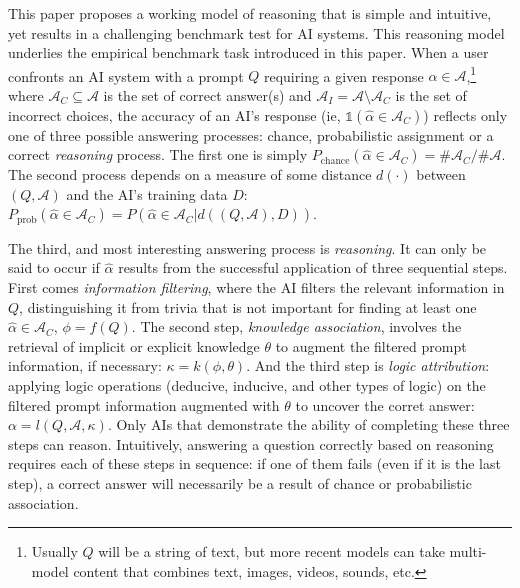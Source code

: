 \documentclass[
]{article}
\begin{document}
This paper proposes a working model of reasoning that is simple and
intuitive, yet results in a challenging benchmark test for AI systems.
This reasoning model underlies the empirical benchmark task introduced
in this paper. When a user confronts an AI system with a prompt \(Q\)
requiring a given response \(\alpha \in \mathcal{A}\),\footnote{Usually
  \(Q\) will be a string of text, but more recent models can take
  multi-model content that combines text, images, videos, sounds, etc.}
where \(\mathcal{A}_C \subseteq \mathcal{A}\) is the set of correct
answer(s) and \(\mathcal{A}_I = \mathcal{A} \setminus \mathcal{A}_C\) is
the set of incorrect choices, the accuracy of an AI's response (ie,
\(\mathbb{1}(\hat{\alpha} \in \mathcal{A}_C)\)) reflects only one of
three possible answering processes: chance, probabilistic assignment or
a correct \emph{reasoning} process. The first one is simply
\(P_{\text{chance}}(\hat{\alpha} \in \mathcal{A}_C) = \#\mathcal{A}_C / \#\mathcal{A}\).
The second process depends on a measure of some distance \(d(\cdot)\)
between \((Q, \mathcal{A})\) and the AI's training data \(D\):
\(P_{\text{prob}}(\hat{\alpha} \in \mathcal{A}_C) = P(\hat{\alpha} \in \mathcal{A}_C|d((Q, \mathcal{A}), D))\).

The third, and most interesting answering process is \emph{reasoning}.
It can only be said to occur if \(\hat{\alpha}\) results from the
successful application of three sequential steps. First comes
\emph{information filtering}, where the AI filters the relevant
information in \(Q\), distinguishing it from trivia that is not
important for finding at least one \(\hat{\alpha} \in \mathcal{A}_C\),
\(\phi = f(Q)\). The second step, \emph{knowledge association}, involves
the retrieval of implicit or explicit knowledge \(\theta\) to augment
the filtered prompt information, if necessary:
\(\kappa = k(\phi, \theta)\). And the third step is \emph{logic
attribution}: applying logic operations (deducive, inducive, and other
types of logic) on the filtered prompt information augmented with
\(\theta\) to uncover the corret answer:
\(\alpha = l(Q, \mathcal{A}, \kappa)\). Only AIs that demonstrate the
ability of completing these three steps can reason. Intuitively,
answering a question correctly based on reasoning requires each of these
steps in sequence: if one of them fails (even if it is the last step), a
correct answer will necessarily be a result of chance or probabilistic
association.
\end{document}
